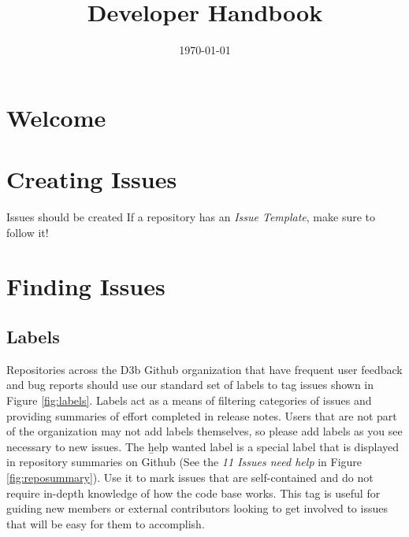 \documentclass[a4paper,12pt,titlepage]{scrartcl}
\title{Developer Handbook}
\date{\today}
\begin{document}
	\maketitle
	
	\tableofcontents
	\newpage
   
	\section{Welcome}
   
	\section{Creating Issues}
	
	Issues should be created 
	If a repository has an {\em Issue Template}, make sure to follow it!
      
	\section{Finding Issues}
	
	\subsection{Labels}
	
	Repositories across the D3b Github organization that have frequent user feedback and bug reports should use our standard set of labels to tag issues shown in Figure \ref{fig:labels}.
	Labels act as a means of filtering categories of issues and providing summaries of effort completed in release notes.
	Users that are not part of the organization may not add labels themselves, so please add labels as you see necessary to new issues.
	The {\b help wanted} label is a special label that is displayed in repository summaries on Github (See the {\em 11 Issues need help} in Figure \ref{fig:reposummary}).
	Use it to mark issues that are self-contained and do not require in-depth knowledge of how the code base works.
	This tag is useful for guiding new members or external contributors looking to get involved to issues that will be easy for them to accomplish.
   
\end{document}
